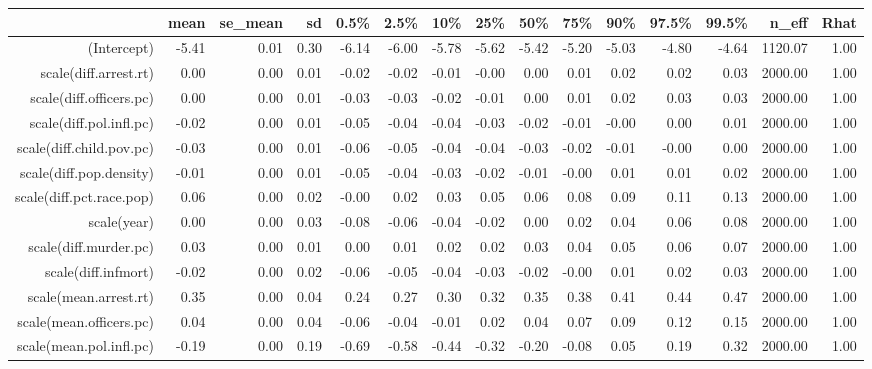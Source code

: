 \begin{table}[ht]
\centering
\begin{tabular}{rrrrrrrrrrrrrrr}
  \hline
 & mean & se\_mean & sd & 0.5\% & 2.5\% & 10\% & 25\% & 50\% & 75\% & 90\% & 97.5\% & 99.5\% & n\_eff & Rhat \\ 
  \hline
(Intercept) & -5.41 & 0.01 & 0.30 & -6.14 & -6.00 & -5.78 & -5.62 & -5.42 & -5.20 & -5.03 & -4.80 & -4.64 & 1120.07 & 1.00 \\ 
  scale(diff.arrest.rt) & 0.00 & 0.00 & 0.01 & -0.02 & -0.02 & -0.01 & -0.00 & 0.00 & 0.01 & 0.02 & 0.02 & 0.03 & 2000.00 & 1.00 \\ 
  scale(diff.officers.pc) & 0.00 & 0.00 & 0.01 & -0.03 & -0.03 & -0.02 & -0.01 & 0.00 & 0.01 & 0.02 & 0.03 & 0.03 & 2000.00 & 1.00 \\ 
  scale(diff.pol.infl.pc) & -0.02 & 0.00 & 0.01 & -0.05 & -0.04 & -0.04 & -0.03 & -0.02 & -0.01 & -0.00 & 0.00 & 0.01 & 2000.00 & 1.00 \\ 
  scale(diff.child.pov.pc) & -0.03 & 0.00 & 0.01 & -0.06 & -0.05 & -0.04 & -0.04 & -0.03 & -0.02 & -0.01 & -0.00 & 0.00 & 2000.00 & 1.00 \\ 
  scale(diff.pop.density) & -0.01 & 0.00 & 0.01 & -0.05 & -0.04 & -0.03 & -0.02 & -0.01 & -0.00 & 0.01 & 0.01 & 0.02 & 2000.00 & 1.00 \\ 
  scale(diff.pct.race.pop) & 0.06 & 0.00 & 0.02 & -0.00 & 0.02 & 0.03 & 0.05 & 0.06 & 0.08 & 0.09 & 0.11 & 0.13 & 2000.00 & 1.00 \\ 
  scale(year) & 0.00 & 0.00 & 0.03 & -0.08 & -0.06 & -0.04 & -0.02 & 0.00 & 0.02 & 0.04 & 0.06 & 0.08 & 2000.00 & 1.00 \\ 
  scale(diff.murder.pc) & 0.03 & 0.00 & 0.01 & 0.00 & 0.01 & 0.02 & 0.02 & 0.03 & 0.04 & 0.05 & 0.06 & 0.07 & 2000.00 & 1.00 \\ 
  scale(diff.infmort) & -0.02 & 0.00 & 0.02 & -0.06 & -0.05 & -0.04 & -0.03 & -0.02 & -0.00 & 0.01 & 0.02 & 0.03 & 2000.00 & 1.00 \\ 
  scale(mean.arrest.rt) & 0.35 & 0.00 & 0.04 & 0.24 & 0.27 & 0.30 & 0.32 & 0.35 & 0.38 & 0.41 & 0.44 & 0.47 & 2000.00 & 1.00 \\ 
  scale(mean.officers.pc) & 0.04 & 0.00 & 0.04 & -0.06 & -0.04 & -0.01 & 0.02 & 0.04 & 0.07 & 0.09 & 0.12 & 0.15 & 2000.00 & 1.00 \\ 
  scale(mean.pol.infl.pc) & -0.19 & 0.00 & 0.19 & -0.69 & -0.58 & -0.44 & -0.32 & -0.20 & -0.08 & 0.05 & 0.19 & 0.32 & 2000.00 & 1.00 \\ 

\end{tabular}
\end{table}
